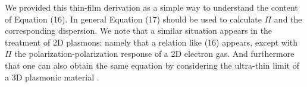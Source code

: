 \documentclass[aps,prb,twocolumn,
	groupedaddress,superscriptaddress,
	amsfonts,amssymb,amsmath,floatfix,
	citeautoscript]{revtex4-1}
\begin{document}
We provided this thin-film derivation as a simple way to understand the content of Equation (16). In general Equation (17) should be used to calculate $\Pi$ and the corresponding dispersion. We note that a similar situation appears in the treatment of 2D plasmons: namely that a relation like (16) appears, except with $\Pi$ the polarization-polarization response of a 2D electron gas. And furthermore that one can also obtain the same equation by considering the ultra-thin limit of a 3D plasmonic material \cite{jablan2009plasmonics,jablan2013plasmons}.


\end{document}
